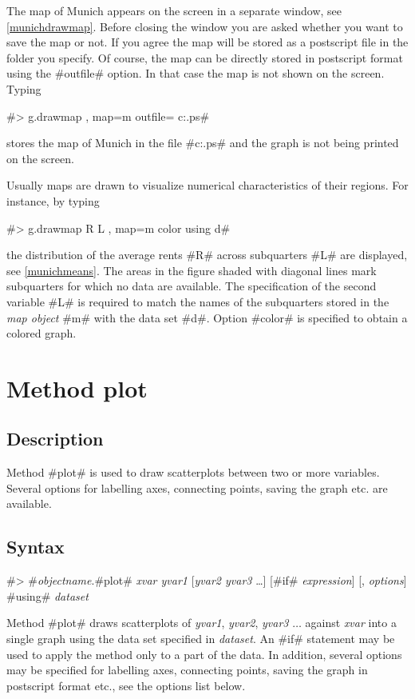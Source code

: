The map of Munich appears on the screen in a separate window, see
\autoref{munichdrawmap}. Before closing the window you are asked
whether you want to save the map or not. If you agree the map will
be stored as a postscript file in the folder you specify. Of
course, the map can be directly stored in postscript format
using the #outfile# option. In that case the map is not shown on the screen. Typing

#> g.drawmap , map=m outfile= c:\temp\munich.ps#

stores the map of Munich in the file
#c:\temp\munich.ps# and the graph is not
being printed on the screen.

Usually maps are drawn to visualize numerical characteristics of
their regions. For instance,
by typing

#> g.drawmap R L , map=m color using d#

the distribution of the average rents #R# across subquarters #L#
are displayed, see \autoref{munichmeans}. The areas in the figure
shaded with diagonal lines mark subquarters for which  no data are
available. The specification of the second variable #L# is
required to match the names of the subquarters stored in the {\em map
object} #m# with the data set #d#. Option #color# is specified to
obtain a colored graph.

\section{Method plot}
\label{graphplot} 
 

\subsection*{Description}

Method #plot# is used to draw scatterplots between two or more
variables. Several options for labelling axes, connecting points,
saving the graph etc. are available.

\subsection*{Syntax}

#> #{\em objectname}.#plot#  {\em xvar yvar1} [{\em yvar2 yvar3}
\dots]
[#if# {\em expression}] [, {\em options}] #using# {\em dataset}

Method #plot# draws scatterplots of {\em yvar1}, {\em yvar2}, {\em
yvar3} $\dots$ against {\em xvar} into a single graph using the
data set specified in {\em dataset}. An #if# statement may be used
to apply the method only to a part of the data. In addition,
several options may be specified for labelling axes, connecting
points, saving the graph in postscript format etc., see the
options list below.


